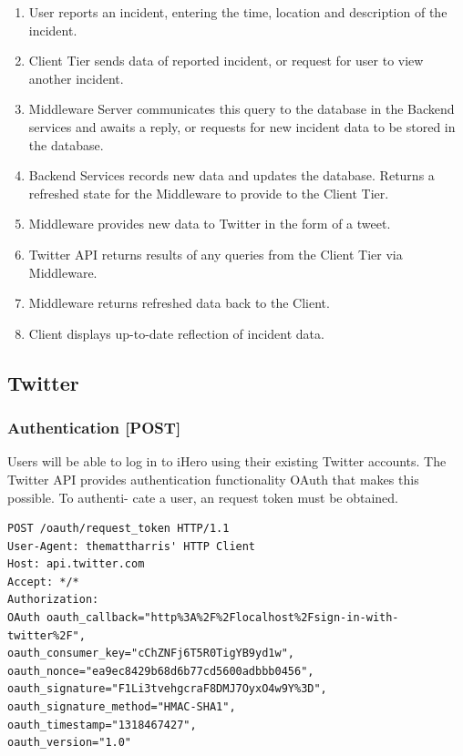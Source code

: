 \documentclass{sig-alt-release2}
\begin{document}
\begin{enumerate}
\item    User reports an incident, entering the time, location and description of the incident.
\item    Client Tier sends data of reported incident, or request for user to view another incident.
\item    Middleware Server communicates this query to the database in the Backend services and awaits a reply, or requests for new incident data to be stored in the database.
\item    Backend Services records new data and updates the database. Returns a refreshed state for the Middleware to provide to the Client Tier.
\item    Middleware provides new data to Twitter in the form of a tweet.
\item    Twitter API returns results of any queries from the Client Tier via Middleware.
\item    Middleware returns refreshed data back to the Client.
\item    Client displays up-to-date reflection of incident data.
\end{enumerate}

\subsection{Twitter}

\subsubsection{Authentication [POST]}

Users will be able to log in to iHero using their existing
Twitter accounts. The Twitter API provides authentication
functionality OAuth that makes this possible. To authenti-
cate a user, an request token must be obtained.

\tiny
\begin{verbatim}
POST /oauth/request_token HTTP/1.1
User-Agent: themattharris' HTTP Client
Host: api.twitter.com
Accept: */*
Authorization:
OAuth oauth_callback="http%3A%2F%2Flocalhost%2Fsign-in-with-twitter%2F",
oauth_consumer_key="cChZNFj6T5R0TigYB9yd1w",
oauth_nonce="ea9ec8429b68d6b77cd5600adbbb0456",
oauth_signature="F1Li3tvehgcraF8DMJ7OyxO4w9Y%3D",
oauth_signature_method="HMAC-SHA1",
oauth_timestamp="1318467427",
oauth_version="1.0"
\end{verbatim}
\normalsize
\end{document}
